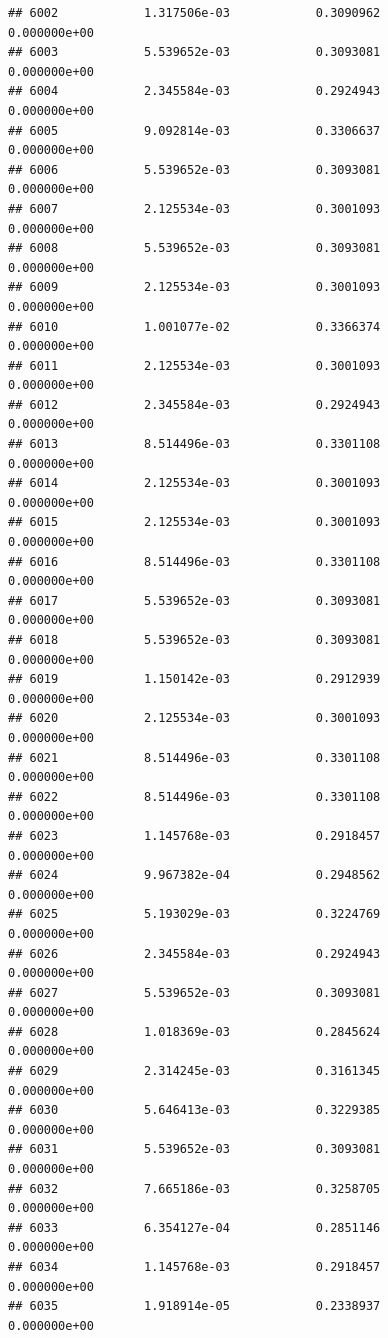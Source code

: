 \documentclass[
]{article}
\begin{document}
\begin{verbatim}
## 6002            1.317506e-03            0.3090962            0.000000e+00
## 6003            5.539652e-03            0.3093081            0.000000e+00
## 6004            2.345584e-03            0.2924943            0.000000e+00
## 6005            9.092814e-03            0.3306637            0.000000e+00
## 6006            5.539652e-03            0.3093081            0.000000e+00
## 6007            2.125534e-03            0.3001093            0.000000e+00
## 6008            5.539652e-03            0.3093081            0.000000e+00
## 6009            2.125534e-03            0.3001093            0.000000e+00
## 6010            1.001077e-02            0.3366374            0.000000e+00
## 6011            2.125534e-03            0.3001093            0.000000e+00
## 6012            2.345584e-03            0.2924943            0.000000e+00
## 6013            8.514496e-03            0.3301108            0.000000e+00
## 6014            2.125534e-03            0.3001093            0.000000e+00
## 6015            2.125534e-03            0.3001093            0.000000e+00
## 6016            8.514496e-03            0.3301108            0.000000e+00
## 6017            5.539652e-03            0.3093081            0.000000e+00
## 6018            5.539652e-03            0.3093081            0.000000e+00
## 6019            1.150142e-03            0.2912939            0.000000e+00
## 6020            2.125534e-03            0.3001093            0.000000e+00
## 6021            8.514496e-03            0.3301108            0.000000e+00
## 6022            8.514496e-03            0.3301108            0.000000e+00
## 6023            1.145768e-03            0.2918457            0.000000e+00
## 6024            9.967382e-04            0.2948562            0.000000e+00
## 6025            5.193029e-03            0.3224769            0.000000e+00
## 6026            2.345584e-03            0.2924943            0.000000e+00
## 6027            5.539652e-03            0.3093081            0.000000e+00
## 6028            1.018369e-03            0.2845624            0.000000e+00
## 6029            2.314245e-03            0.3161345            0.000000e+00
## 6030            5.646413e-03            0.3229385            0.000000e+00
## 6031            5.539652e-03            0.3093081            0.000000e+00
## 6032            7.665186e-03            0.3258705            0.000000e+00
## 6033            6.354127e-04            0.2851146            0.000000e+00
## 6034            1.145768e-03            0.2918457            0.000000e+00
## 6035            1.918914e-05            0.2338937            0.000000e+00

\end{verbatim}
\end{document}
